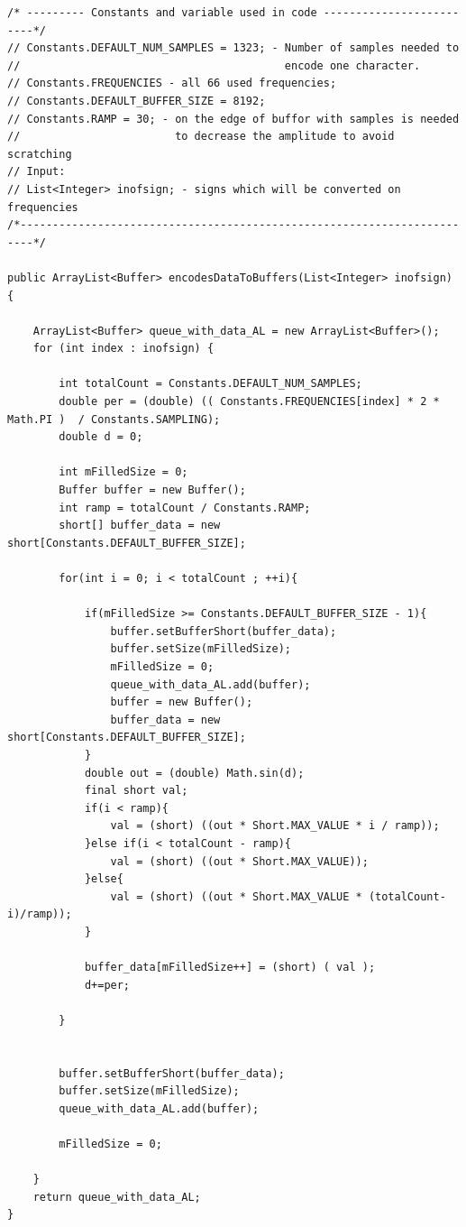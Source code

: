 \documentclass[11pt,titlepage]{article}
\theoremstyle{plain}
\begin{document}
\begin{minipage}{\linewidth}
\begin{lstlisting}[label={lst:sinus}]
/* --------- Constants and variable used in code -------------------------*/
// Constants.DEFAULT_NUM_SAMPLES = 1323; - Number of samples needed to 	   
//										   encode one character.		   
// Constants.FREQUENCIES - all 66 used frequencies;						   
// Constants.DEFAULT_BUFFER_SIZE = 8192;								   
// Constants.RAMP = 30; - on the edge of buffor with samples is needed     
//						  to decrease the amplitude to avoid scratching    
// Input:																   
// List<Integer> inofsign; - signs which will be converted on frequencies  
/*------------------------------------------------------------------------*/

public ArrayList<Buffer> encodesDataToBuffers(List<Integer> inofsign) {

	ArrayList<Buffer> queue_with_data_AL = new ArrayList<Buffer>();
	for (int index : inofsign) {
		
		int totalCount = Constants.DEFAULT_NUM_SAMPLES; 
		double per = (double) (( Constants.FREQUENCIES[index] * 2 * Math.PI )  / Constants.SAMPLING);
		double d = 0;
		
		int mFilledSize = 0;
		Buffer buffer = new Buffer();
		int ramp = totalCount / Constants.RAMP;
		short[] buffer_data = new short[Constants.DEFAULT_BUFFER_SIZE];
		
		for(int i = 0; i < totalCount ; ++i){
		
			if(mFilledSize >= Constants.DEFAULT_BUFFER_SIZE - 1){
				buffer.setBufferShort(buffer_data);
				buffer.setSize(mFilledSize);
				mFilledSize = 0;
				queue_with_data_AL.add(buffer);
				buffer = new Buffer();
				buffer_data = new short[Constants.DEFAULT_BUFFER_SIZE];
			}
			double out = (double) Math.sin(d);
			final short val;
			if(i < ramp){
				val = (short) ((out * Short.MAX_VALUE * i / ramp));
			}else if(i < totalCount - ramp){
				val = (short) ((out * Short.MAX_VALUE));
			}else{
				val = (short) ((out * Short.MAX_VALUE * (totalCount-i)/ramp));
			}
			
			buffer_data[mFilledSize++] = (short) ( val );
			d+=per;
			
		}
		
		
		buffer.setBufferShort(buffer_data);
		buffer.setSize(mFilledSize);
		queue_with_data_AL.add(buffer);
		
		mFilledSize = 0;

	}
	return queue_with_data_AL;
}
\end{lstlisting} 
\end{minipage}
\end{document}

